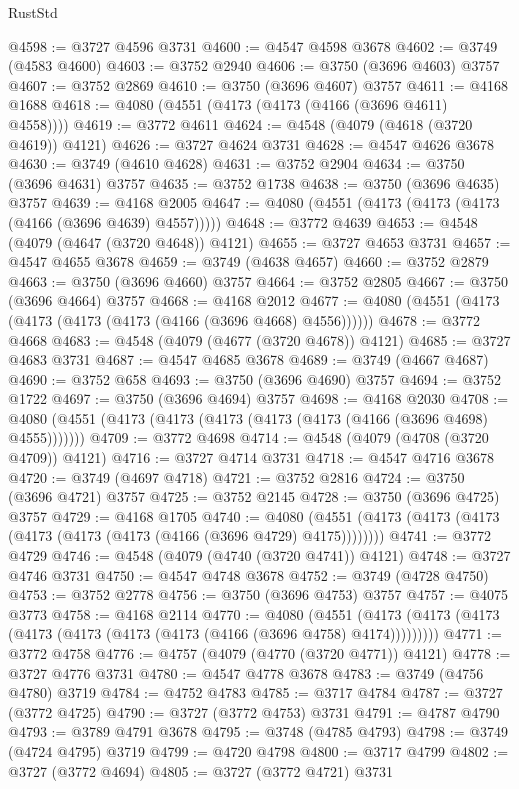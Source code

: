 \begin{lexlean}{RustStd}
\begin{coremodule}
@4598 := @3727 @4596 @3731
@4600 := @4547 @4598 @3678
@4602 := @3749 (@4583 @4600)
@4603 := @3752 @2940
@4606 := @3750 (@3696 @4603) @3757
@4607 := @3752 @2869
@4610 := @3750 (@3696 @4607) @3757
@4611 := @4168 @1688
@4618 := @4080 (@4551 (@4173 (@4173 (@4166 (@3696 @4611) @4558))))
@4619 := @3772 @4611
@4624 := @4548 (@4079 (@4618 (@3720 @4619)) @4121)
@4626 := @3727 @4624 @3731
@4628 := @4547 @4626 @3678
@4630 := @3749 (@4610 @4628)
@4631 := @3752 @2904
@4634 := @3750 (@3696 @4631) @3757
@4635 := @3752 @1738
@4638 := @3750 (@3696 @4635) @3757
@4639 := @4168 @2005
@4647 := @4080 (@4551 (@4173 (@4173 (@4173 (@4166 (@3696 @4639) @4557)))))
@4648 := @3772 @4639
@4653 := @4548 (@4079 (@4647 (@3720 @4648)) @4121)
@4655 := @3727 @4653 @3731
@4657 := @4547 @4655 @3678
@4659 := @3749 (@4638 @4657)
@4660 := @3752 @2879
@4663 := @3750 (@3696 @4660) @3757
@4664 := @3752 @2805
@4667 := @3750 (@3696 @4664) @3757
@4668 := @4168 @2012
@4677 := @4080 (@4551 (@4173 (@4173 (@4173 (@4173 (@4166 (@3696 @4668) @4556))))))
@4678 := @3772 @4668
@4683 := @4548 (@4079 (@4677 (@3720 @4678)) @4121)
@4685 := @3727 @4683 @3731
@4687 := @4547 @4685 @3678
@4689 := @3749 (@4667 @4687)
@4690 := @3752 @658
@4693 := @3750 (@3696 @4690) @3757
@4694 := @3752 @1722
@4697 := @3750 (@3696 @4694) @3757
@4698 := @4168 @2030
@4708 := @4080 (@4551 (@4173 (@4173 (@4173 (@4173 (@4173 (@4166 (@3696 @4698) @4555)))))))
@4709 := @3772 @4698
@4714 := @4548 (@4079 (@4708 (@3720 @4709)) @4121)
@4716 := @3727 @4714 @3731
@4718 := @4547 @4716 @3678
@4720 := @3749 (@4697 @4718)
@4721 := @3752 @2816
@4724 := @3750 (@3696 @4721) @3757
@4725 := @3752 @2145
@4728 := @3750 (@3696 @4725) @3757
@4729 := @4168 @1705
@4740 := @4080 (@4551 (@4173 (@4173 (@4173 (@4173 (@4173 (@4173 (@4166 (@3696 @4729) @4175))))))))
@4741 := @3772 @4729
@4746 := @4548 (@4079 (@4740 (@3720 @4741)) @4121)
@4748 := @3727 @4746 @3731
@4750 := @4547 @4748 @3678
@4752 := @3749 (@4728 @4750)
@4753 := @3752 @2778
@4756 := @3750 (@3696 @4753) @3757
@4757 := @4075 @3773
@4758 := @4168 @2114
@4770 := @4080
    (@4551 (@4173 (@4173 (@4173 (@4173 (@4173 (@4173 (@4173 (@4166 (@3696 @4758) @4174)))))))))
@4771 := @3772 @4758
@4776 := @4757 (@4079 (@4770 (@3720 @4771)) @4121)
@4778 := @3727 @4776 @3731
@4780 := @4547 @4778 @3678
@4783 := @3749 (@4756 @4780) @3719
@4784 := @4752 @4783
@4785 := @3717 @4784
@4787 := @3727 (@3772 @4725)
@4790 := @3727 (@3772 @4753) @3731
@4791 := @4787 @4790
@4793 := @3789 @4791 @3678
@4795 := @3748 (@4785 @4793)
@4798 := @3749 (@4724 @4795) @3719
@4799 := @4720 @4798
@4800 := @3717 @4799
@4802 := @3727 (@3772 @4694)
@4805 := @3727 (@3772 @4721) @3731

\end{coremodule}
\end{lexlean}
